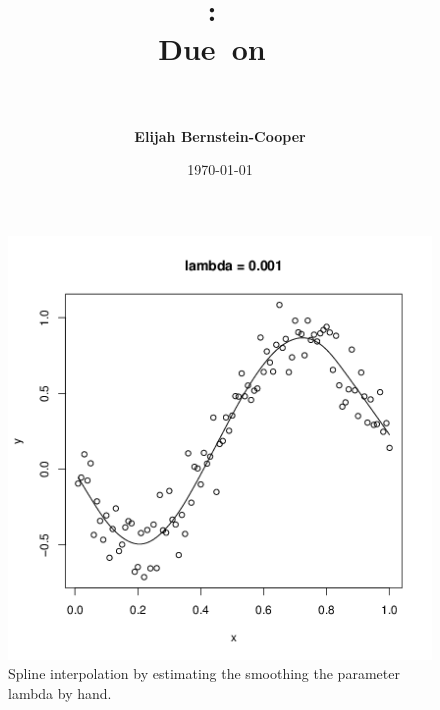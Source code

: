 \documentclass[11pt]{article}
\title{\vspace{0in}
    \textmd{\textbf{\hmwkClass:\ \hmwkTitle}}\\
    \normalsize\vspace{0.1in}\small{Due\ on\ \hmwkDueDate}\\
    \vspace{0.1in}\large{\textit{\hmwkClassInstructor\ \hmwkClassTime}}
    \vspace{0.2in}}
\author{\textbf{Elijah Bernstein-Cooper}}
\date{\today} %
\begin{document}
\maketitle

\begin{homeworkProblem}

        \begin{figure}[!ht]
            
            \begin{centering}
                \includegraphics[scale=0.8]{manual_fit.png}

            \caption{Spline interpolation by estimating the smoothing the
            parameter lambda by hand.}

            \end{centering}
        \end{figure}

        \begin{figure}[!ht]
            

\end{figure}
\end{homeworkProblem}
\end{document}
